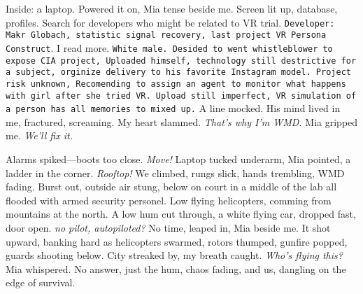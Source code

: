 \documentclass[12pt,oneside]{book}
\newcommand{\note}[1]{\texttt{#1}}
\begin{document}
Inside: a laptop. Powered it on, Mia tense beside me. Screen lit up, database, profiles. Search for developers who might be related to VR trial. \note{Developer: Makr Globach, statistic signal recovery, last project VR Persona Construct}. I read more. \note{White male. Desided to went whistleblower to expose CIA project, Uploaded himself, technology still destrictive for a subject, orginize delivery to his favorite Instagram model. Project risk unknown, Recomending to assign an agent to monitor what happens with girl after she tried VR. Upload still imperfect, VR simulation of a person has all memories to mixed up.} A line mocked. His mind lived in me, fractured, screaming. My heart slammed. \textit{That’s why I’m WMD.} Mia gripped me. \textit{We’ll fix it.}

Alarms spiked—boots too close. \textit{Move!} Laptop tucked underarm, Mia pointed, a ladder in the corner. \textit{Rooftop!} We climbed, rungs slick, hands trembling, WMD fading. Burst out, outside air stung,  below on court in a middle of the lab all flooded with armed security personel. Low flying helicopters, comming from mountains at the north. 
A low hum cut through, a white flying car, dropped fast, door open. \textit{no pilot, autopiloted?} No time, leaped in, Mia beside me. It shot upward, banking hard as helicopters swarmed, rotors thumped, gunfire popped, guards shooting below. City streaked by, my breath caught. \textit{Who’s flying this?} Mia whispered. No answer, just the hum, chaos fading, and us, dangling on the edge of survival.
\end{document}

